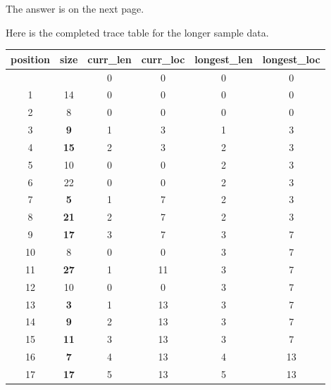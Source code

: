 The answer is on the next page.


\clearpage %

Here is the completed trace table for the longer sample data.

\begin{inlinetable}
  \begin{tabular}{S[table-format=2.0]S[table-format=2.0]S[table-format=2.0]
    S[table-format=2.0]S[table-format=2.0]S[table-format=2.0]}
    \toprule
    {position} & {size}       & {curr\_len} & {curr\_loc} & {longest\_len} & {longest\_loc} \\
    \midrule
               &              & 0           & 0           & 0              & 0              \\
    1          & 14           & 0           & 0           & 0              & 0              \\
    2          & 8            & 0           & 0           & 0              & 0              \\
    3          & \bfseries 9  & 1           & 3           & 1              & 3              \\
    4          & \bfseries 15 & 2           & 3           & 2              & 3              \\
    5          & 10           & 0           & 0           & 2              & 3              \\
    6          & 22           & 0           & 0           & 2              & 3              \\
    7          & \bfseries 5  & 1           & 7           & 2              & 3              \\
    8          & \bfseries 21 & 2           & 7           & 2              & 3              \\
    9          & \bfseries 17 & 3           & 7           & 3              & 7              \\
    10         & 8            & 0           & 0           & 3              & 7              \\
    11         & \bfseries 27 & 1           & 11          & 3              & 7              \\
    12         & 10           & 0           & 0           & 3              & 7              \\
    13         & \bfseries 3  & 1           & 13          & 3              & 7              \\
    14         & \bfseries 9  & 2           & 13          & 3              & 7              \\
    15         & \bfseries 11 & 3           & 13          & 3              & 7              \\
    16         & \bfseries 7  & 4           & 13          & 4              & 13             \\
    17         & \bfseries 17 & 5           & 13          & 5              & 13             \\
    \bottomrule
  \end{tabular}
\end{inlinetable}
